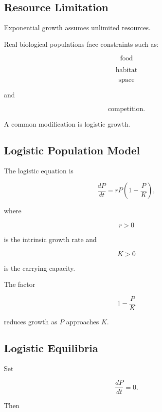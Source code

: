 \subsection{Resource Limitation}
\label{subsec:biological-resource-limitation}

Exponential growth assumes unlimited resources.

Real biological populations face constraints such as:

\[
\boxed{
\text{food}
}
\]

\[
\boxed{
\text{habitat}
}
\]

\[
\boxed{
\text{space}
}
\]

and

\[
\boxed{
\text{competition}.
}
\]

A common modification is logistic growth.

\subsection{Logistic Population Model}
\label{subsec:logistic-population-model}

The logistic equation is

\[
\boxed{
\frac{dP}{dt}
=
rP
\left(
1-\frac{P}{K}
\right),
}
\]

where

\[
r>0
\]

is the intrinsic growth rate and

\[
K>0
\]

is the carrying capacity.

The factor

\[
1-\frac{P}{K}
\]

reduces growth as \(P\) approaches \(K\).

\subsection{Logistic Equilibria}
\label{subsec:logistic-population-equilibria}

Set

\[
\frac{dP}{dt}=0.
\]

Then

